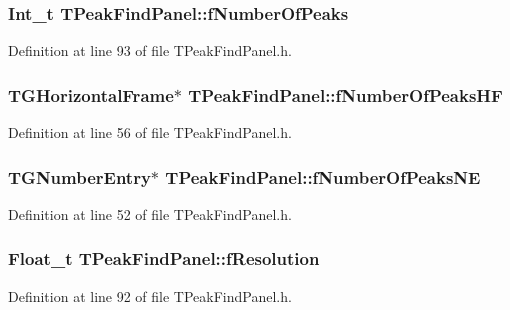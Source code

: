 \subsubsection[{fNumberOfPeaks}]{\setlength{\rightskip}{0pt plus 5cm}Int\_\-t {\bf TPeakFindPanel::fNumberOfPeaks}\hspace{0.3cm}{\ttfamily  [protected]}}\label{classTPeakFindPanel_ae2305f3e528673b10dba75b633adb217}


Definition at line 93 of file TPeakFindPanel.h.
\subsubsection[{fNumberOfPeaksHF}]{\setlength{\rightskip}{0pt plus 5cm}TGHorizontalFrame$\ast$ {\bf TPeakFindPanel::fNumberOfPeaksHF}\hspace{0.3cm}{\ttfamily  [private]}}\label{classTPeakFindPanel_a2205b631e3ab0cc4ae267a4c2f94e1bf}


Definition at line 56 of file TPeakFindPanel.h.
\subsubsection[{fNumberOfPeaksNE}]{\setlength{\rightskip}{0pt plus 5cm}TGNumberEntry$\ast$ {\bf TPeakFindPanel::fNumberOfPeaksNE}\hspace{0.3cm}{\ttfamily  [private]}}\label{classTPeakFindPanel_aca4a5235670677da0ecfc79a66b88d3a}


Definition at line 52 of file TPeakFindPanel.h.
\subsubsection[{fResolution}]{\setlength{\rightskip}{0pt plus 5cm}Float\_\-t {\bf TPeakFindPanel::fResolution}\hspace{0.3cm}{\ttfamily  [protected]}}\label{classTPeakFindPanel_a6665778f2b2a4629d3d7725da1f10ec4}


Definition at line 92 of file TPeakFindPanel.h.

